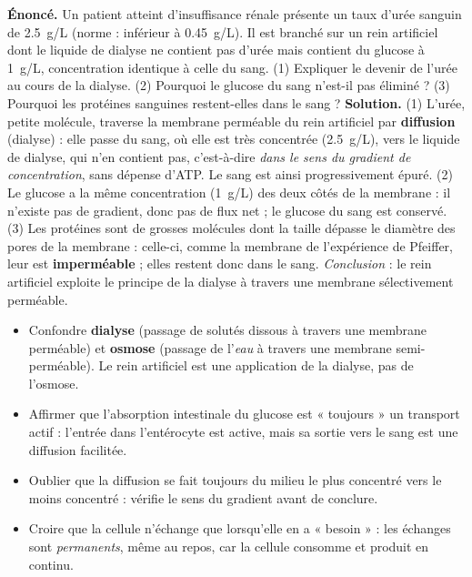 \documentclass[11pt]{article}
\begin{document}
\begin{exoresolu}
\textbf{Énoncé.} Un patient atteint d'insuffisance rénale présente un taux d'urée sanguin de \SI{2,5}{g/L} (norme : inférieur à \SI{0,45}{g/L}). Il est branché sur un rein artificiel dont le liquide de dialyse ne contient pas d'urée mais contient du glucose à \SI{1}{g/L}, concentration identique à celle du sang. (1) Expliquer le devenir de l'urée au cours de la dialyse. (2) Pourquoi le glucose du sang n'est-il pas éliminé ? (3) Pourquoi les protéines sanguines restent-elles dans le sang ?
\tcblower
\textbf{Solution.} (1) L'urée, petite molécule, traverse la membrane perméable du rein artificiel par \textbf{diffusion} (dialyse) : elle passe du sang, où elle est très concentrée (\SI{2,5}{g/L}), vers le liquide de dialyse, qui n'en contient pas, c'est-à-dire \emph{dans le sens du gradient de concentration}, sans dépense d'ATP. Le sang est ainsi progressivement épuré. (2) Le glucose a la même concentration (\SI{1}{g/L}) des deux côtés de la membrane : il n'existe pas de gradient, donc pas de flux net ; le glucose du sang est conservé. (3) Les protéines sont de grosses molécules dont la taille dépasse le diamètre des pores de la membrane : celle-ci, comme la membrane de l'expérience de Pfeiffer, leur est \textbf{imperméable} ; elles restent donc dans le sang. \emph{Conclusion} : le rein artificiel exploite le principe de la dialyse à travers une membrane sélectivement perméable.
\end{exoresolu}

\begin{attention}
\begin{itemize}
\item Confondre \textbf{dialyse} (passage de solutés dissous à travers une membrane perméable) et \textbf{osmose} (passage de l'\emph{eau} à travers une membrane semi-perméable). Le rein artificiel est une application de la dialyse, pas de l'osmose.
\item Affirmer que l'absorption intestinale du glucose est « toujours » un transport actif : l'entrée dans l'entérocyte est active, mais sa sortie vers le sang est une diffusion facilitée.
\item Oublier que la diffusion se fait toujours du milieu le plus concentré vers le moins concentré : vérifie le sens du gradient avant de conclure.
\item Croire que la cellule n'échange que lorsqu'elle en a « besoin » : les échanges sont \emph{permanents}, même au repos, car la cellule consomme et produit en continu.
\end{itemize}
\end{attention}
\end{document}
